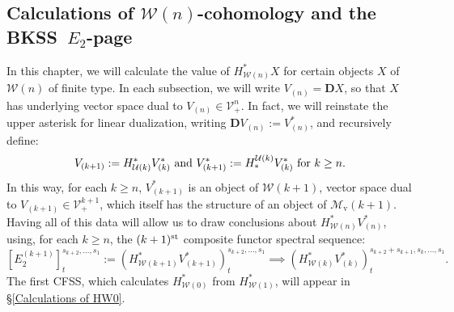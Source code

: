 \documentclass[11pt]{amsart} \renewcommand{\baselinestretch}{1.2}
\theoremstyle{plain}
\numberwithin{equation}{section} %
\theoremstyle{plain}
\numberwithin{equation}{chapter} %
\newcommand{\calU}{\mathcal{U}}
\newcommand{\calV}{\mathcal{V}}
\newcommand{\calw}{\mathcal{W}}
\newcommand{\calMv}{\mathcal{M}\dver}
\newcommand{\vect}[2]{\calV^{#1}_{#2}}
\newcommand{\E}[5]{[E^{#1}_{#2}#3]^{#4}_{#5}}
\newcommand{\dver}{_\mathrm{v}}
\newcommand{\dual}{\mathbf{D}}
\newcommand{\BKSS}{BKSS}
\newcommand{\CFSS}{CFSS}
\newcommand{\SectionOrChapter}[1]{\section{\textbf{#1}}}
\begin{document}
\begin{Calculations of HWn}
\SectionOrChapter{Calculations of ${\calw(n)}$-cohomology and the \BKSS\ $E_2$-page}
\label{Calculations of HWn}
In this chapter, we will calculate the value of $H^*_{\calw(n)}X$ for certain  objects $X$ of $\calw(n)$ of finite type. In each subsection, we will write $V_{(n)}=\dual X$, so that $X$ has underlying vector space dual to $V_{{(n)}}\in\vect{n}{+}$. In fact, we will reinstate the upper asterisk for linear dualization, writing $\dual V_{(n)}:=V^*_{(n)}$, and recursively define:
\[V_{(k+1)}:=H^*_{\calU(k)}V^*_{(k)}\textup{ and }V^*_{(k+1)}:=H_*^{\calU(k)}V^*_{(k)}\textup{ for $k\geq n$}.\]
In this way, for each $k\geq n$, $V^*_{(k+1)}$ is an object of $\calw(k+1)$, vector space dual to $V_{(k+1)}\in\vect{k+1}{+}$, which itself has the structure of an object of $\calMv(k+1)$.
Having all of this data will allow us to draw conclusions about $H^*_{\calw(n)}V^*_{(n)}$, using, for each $k\geq n$, the $(k+1)^{\textup{st}}$ composite functor spectral sequence:
\[\E{(k+1)}{2}{}{s_{k+2},\ldots,s_1}{t}:=(H^*_{\calw(k+1)}V^*_{(k+1)})^{s_{k+2},\ldots,s_1}_{t}\implies (H^*_{\calw(k)}V^*_{(k)})^{s_{k+2}+s_{k+1},s_k,\ldots,s_1}_{t}.\]
The first \CFSS, which calculates $H^*_{\calw(0)}$ from $H^*_{\calw(1)}$, will appear in \S\ref{Calculations of HW0}.




\end{Calculations of HWn}
\end{document}
